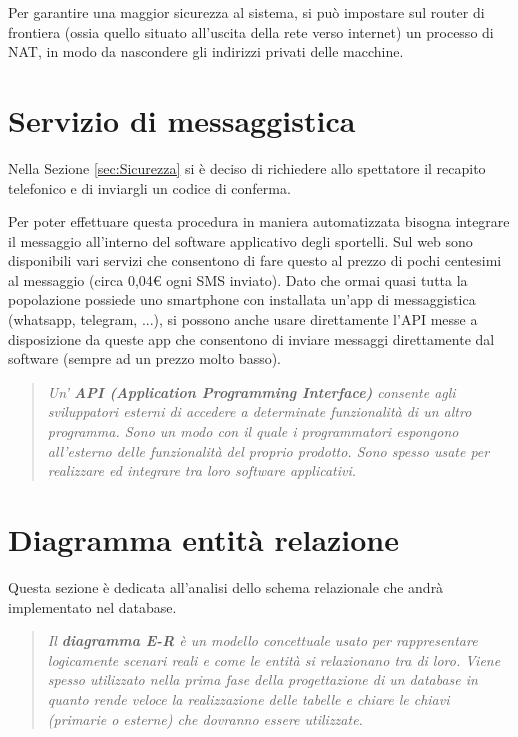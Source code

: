 \documentclass{article}
\begin{document}
Per garantire una maggior sicurezza al sistema, si può impostare sul router di frontiera (ossia quello situato all'uscita della rete verso internet) un processo di NAT, in modo da nascondere gli indirizzi privati delle macchine.

\section{Servizio di messaggistica}\label{sec:Messaggistica}
Nella Sezione \ref{sec:Sicurezza} si è deciso di richiedere allo spettatore il recapito telefonico e di inviargli un codice di conferma.

Per poter effettuare questa procedura in maniera automatizzata bisogna integrare il messaggio all'interno del software applicativo degli sportelli. Sul web sono disponibili vari servizi che consentono di fare questo al prezzo di pochi centesimi al messaggio (circa 0,04€ ogni SMS inviato). Dato che ormai quasi tutta la popolazione possiede uno smartphone con installata un'app di messaggistica (whatsapp, telegram, ...), si possono anche usare direttamente l'API messe a disposizione da queste app che consentono di inviare messaggi direttamente dal software (sempre ad un prezzo molto basso).

\begin{quote}
    \begin{Cit}
    \textit{
    Un' \textbf{API (Application Programming Interface)} consente agli sviluppatori esterni di accedere a determinate funzionalità di un altro programma. Sono un modo con il quale i programmatori espongono all'esterno delle funzionalità del proprio prodotto. Sono spesso usate per realizzare ed integrare tra loro software applicativi.}
    \end{Cit}
    \end{quote}

\section{Diagramma entità relazione}\label{sec:ER}

Questa sezione è dedicata all'analisi dello schema relazionale che andrà implementato nel database.

\begin{quote}
\begin{Cit}
\textit{
Il \textbf{diagramma E-R} è un modello concettuale usato per rappresentare logicamente scenari reali e come le entità si relazionano tra di loro. Viene spesso utilizzato nella prima fase della progettazione di un database in quanto rende veloce la realizzazione delle tabelle e chiare le chiavi (primarie o esterne) che dovranno essere utilizzate.}
\end{Cit}
\end{quote}
\end{document}
